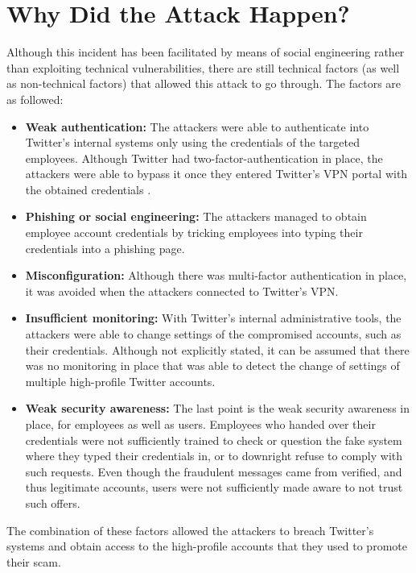 \chapter{Why Did the Attack Happen?}
Although this incident has been facilitated by means of social engineering rather than exploiting technical vulnerabilities, there are still technical factors (as well as non-technical factors) that allowed this attack to go through. 
\newline
The factors are as followed:
\begin{itemize}
\item \textbf{Weak authentication:} The attackers were able to authenticate into Twitter's internal systems only using the credentials of the targeted employees. Although Twitter had two-factor-authentication in place, the attackers were able to bypass it once they entered Twitter's VPN portal with the obtained credentials \cite{arstechnica}.
\item \textbf{Phishing or social engineering:} The attackers managed to obtain employee account credentials by tricking employees into typing their credentials into a phishing page.
\item \textbf{Misconfiguration:} Although there was multi-factor authentication in place, it was avoided when the attackers connected to Twitter's VPN. 
\item \textbf{Insufficient monitoring:} With Twitter's internal administrative tools, the attackers were able to change settings of the compromised accounts, such as their credentials. Although not explicitly stated, it can be assumed that there was no monitoring in place that was able to detect the change of settings of multiple high-profile Twitter accounts.
\item \textbf{Weak security awareness:} The last point is the weak security awareness in place, for employees as well as users. Employees who handed over their credentials were not sufficiently trained to check or question the fake system where they typed their credentials in, or to downright refuse to comply with such requests. Even though the fraudulent messages came from verified, and thus legitimate accounts, users were not sufficiently made aware to not trust such offers.
\end{itemize}
The combination of these factors allowed the attackers to breach Twitter's systems and obtain access to the high-profile accounts that they used to promote their scam.